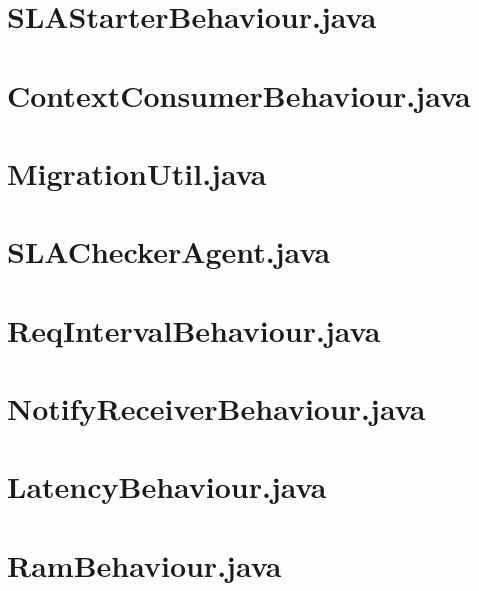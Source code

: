 \section{SLAStarterBehaviour.java}


\section{ContextConsumerBehaviour.java}


\section{MigrationUtil.java}


\section{SLACheckerAgent.java}


\section{ReqIntervalBehaviour.java}


\section{NotifyReceiverBehaviour.java}


\section{LatencyBehaviour.java}


\section{RamBehaviour.java}


